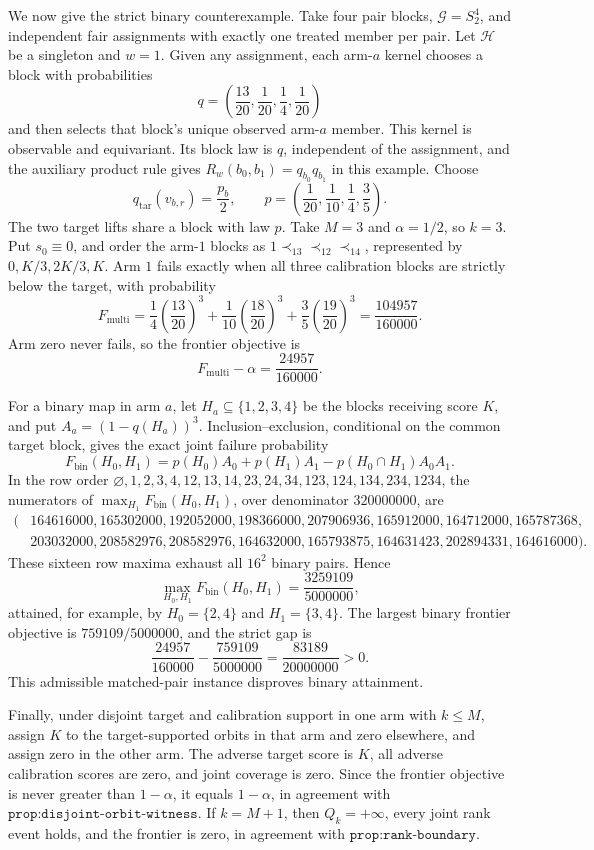 We now give the strict binary counterexample. Take four pair blocks, \(\mathcal G=S_2^4\), and independent fair assignments with exactly one treated member per pair. Let \(\mathcal H\) be a singleton and \(w=1\). Given any assignment, each arm-\(a\) kernel chooses a block with probabilities \[q=\left(\frac{13}{20},\frac1{20},\frac14,\frac1{20}\right)\] and then selects that block's unique observed arm-\(a\) member. This kernel is observable and equivariant. Its block law is \(q\), independent of the assignment, and the auxiliary product rule gives \(R_w(b_0,b_1)=q_{b_0}q_{b_1}\) in this example. Choose \[q_{\mathrm{tar}}(v_{b,r})=\frac{p_b}{2},\qquad p=\left(\frac1{20},\frac1{10},\frac14,\frac35\right).\] The two target lifts share a block with law \(p\). Take \(M=3\) and \(\alpha=1/2\), so \(k=3\). Put \(s_0\equiv0\), and order the arm-\(1\) blocks as \(1\prec_13\prec_12\prec_14\), represented by \(0,K/3,2K/3,K\). Arm \(1\) fails exactly when all three calibration blocks are strictly below the target, with probability \[F_{\mathrm{multi}}=\frac14\left(\frac{13}{20}\right)^3+\frac1{10}\left(\frac{18}{20}\right)^3+\frac35\left(\frac{19}{20}\right)^3=\frac{104957}{160000}.\] Arm zero never fails, so the frontier objective is \[F_{\mathrm{multi}}-\alpha=\frac{24957}{160000}.\]

For a binary map in arm \(a\), let \(H_a\subseteq\{1,2,3,4\}\) be the blocks receiving score \(K\), and put \(A_a=(1-q(H_a))^3\). Inclusion--exclusion, conditional on the common target block, gives the exact joint failure probability \[F_{\mathrm{bin}}(H_0,H_1)=p(H_0)A_0+p(H_1)A_1-p(H_0\cap H_1)A_0A_1.\] In the row order \(\varnothing,1,2,3,4,12,13,14,23,24,34,123,124,134,234,1234\), the numerators of \(\max_{H_1}F_{\mathrm{bin}}(H_0,H_1)\), over denominator \(320000000\), are \[\begin{split}(&164616000,165302000,192052000,198366000,207906936,165912000,164712000,165787368,\\&203032000,208582976,208582976,164632000,165793875,164631423,202894331,164616000).\end{split}\] These sixteen row maxima exhaust all \(16^2\) binary pairs. Hence \[\max_{H_0,H_1}F_{\mathrm{bin}}(H_0,H_1)=\frac{3259109}{5000000},\] attained, for example, by \(H_0=\{2,4\}\) and \(H_1=\{3,4\}\). The largest binary frontier objective is \(759109/5000000\), and the strict gap is \[\frac{24957}{160000}-\frac{759109}{5000000}=\frac{83189}{20000000}>0.\] This admissible matched-pair instance disproves binary attainment.

Finally, under disjoint target and calibration support in one arm with \(k\le M\), assign \(K\) to the target-supported orbits in that arm and zero elsewhere, and assign zero in the other arm. The adverse target score is \(K\), all adverse calibration scores are zero, and joint coverage is zero. Since the frontier objective is never greater than \(1-\alpha\), it equals \(1-\alpha\), in agreement with \(\texttt{prop:disjoint-orbit-witness}\). If \(k=M+1\), then \(Q_k=+\infty\), every joint rank event holds, and the frontier is zero, in agreement with \(\texttt{prop:rank-boundary}\).